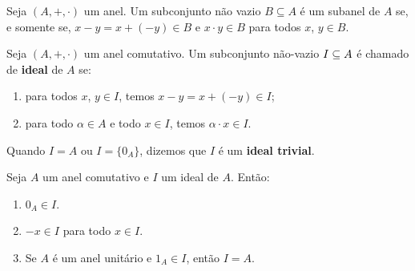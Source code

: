 \documentclass{beamer}
\begin{document}
    \begin{frame}
        \begin{proposicao}
            Seja $(A, +,\cdot)$ um anel. \pause Um subconjunto não vazio \pause $B\subseteq A$ \pause é um subanel de $A$ \pause se, e somente se, \pause $x - y = x + (-y) \in B$ \pause e $x\cdot y \in B$ \pause para todos $x$, $y \in B$.\pause
        \end{proposicao}
    \end{frame}

    \begin{frame}
        \begin{definicao}
            Seja $(A, +, \cdot)$ um anel comutativo. \pause Um subconjunto não-vazio \pause $I \subseteq A$ \pause é chamado de \textbf{ideal} \pause de $A$ se:\pause
            \begin{enumerate}[label={\roman*})]
                \item para todos $x$, $y \in I$, \pause temos $x - y = x + (-y) \in I$;\pause
                \item para todo $\alpha \in A$ \pause e todo $x \in I$, \pause temos $\alpha\cdot x \in I$.\pause
            \end{enumerate}
        \end{definicao}

        \begin{observacao}
            Quando $I = A$ \pause ou $I = \{0_A\}$, \pause dizemos que $I$ \pause é um \textbf{ideal trivial}.\pause
        \end{observacao}
    \end{frame}

    \begin{frame}
        \begin{proposicao}
            Seja $A$ um anel comutativo \pause e $I$ um ideal de $A$. \pause Então:\pause
            \begin{enumerate}[label={\roman*})]
                \item $0_{A}\in I$.\pause
                \item $-x \in I$ \pause para todo $x \in I$.\pause
                \item Se $A$ é um anel unitário e $1_A \in I$, \pause então $I = A$.\pause
            \end{enumerate}
        \end{proposicao}
    \end{frame}
\end{document}
